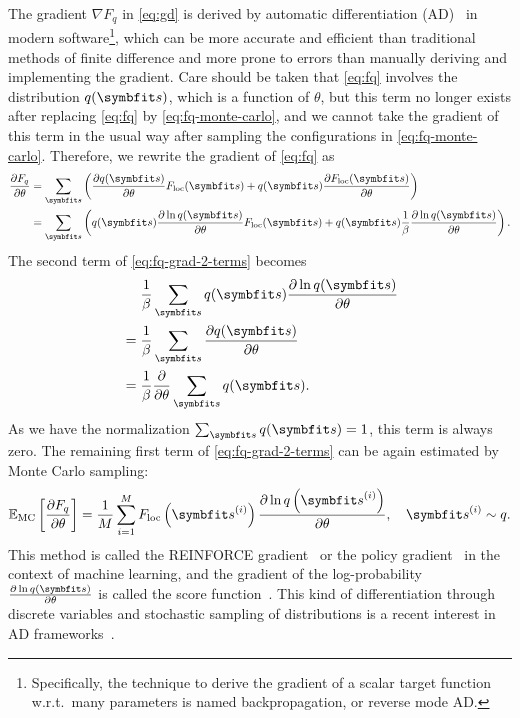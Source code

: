 The gradient $\nabla F_q$ in \cref{eq:gd} is derived by automatic differentiation (AD)~\cite{baydin2018automatic} in modern software\footnote{Specifically, the technique to derive the gradient of a scalar target function w.r.t.\ many parameters is named backpropagation, or reverse mode AD.}, which can be more accurate and efficient than traditional methods of finite difference and more prone to errors than manually deriving and implementing the gradient. Care should be taken that \cref{eq:fq} involves the distribution $q(\vs)$, which is a function of $\theta$, but this term no longer exists after replacing \cref{eq:fq} by \cref{eq:fq-monte-carlo}, and we cannot take the gradient of this term in the usual way after sampling the configurations in \cref{eq:fq-monte-carlo}. Therefore, we rewrite the gradient of \cref{eq:fq} as
\begin{align}
\frac{\partial F_q}{\partial \theta}
&= \sum_\vs \left( \frac{\partial q(\vs)}{\partial \theta} F_\text{loc}(\vs) + q(\vs) \frac{\partial F_\text{loc}(\vs)}{\partial \theta} \right) \\
&= \sum_\vs \left( q(\vs) \frac{\partial \ln q(\vs)}{\partial \theta} F_\text{loc}(\vs) + q(\vs) \frac{1}{\beta} \frac{\partial \ln q(\vs)}{\partial \theta} \right).
\label{eq:fq-grad-2-terms}
\end{align}
The second term of \cref{eq:fq-grad-2-terms} becomes
\begin{align}
&\phantom{{}={}}\frac{1}{\beta} \sum_\vs q(\vs) \frac{\partial \ln q(\vs)}{\partial \theta} \\
&= \frac{1}{\beta} \sum_\vs \frac{\partial q(\vs)}{\partial \theta} \\
&= \frac{1}{\beta} \frac{\partial}{\partial \theta} \sum_\vs q(\vs).
\end{align}
As we have the normalization $\sum_\vs q(\vs) = 1$, this term is always zero. The remaining first term of \cref{eq:fq-grad-2-terms} can be again estimated by Monte Carlo sampling:
\begin{equation}
\bbE_\text{MC}\left[ \frac{\partial F_q}{\partial \theta} \right]
= \frac{1}{M} \sum_{i = 1}^M F_\text{loc}\left( \vs^{(i)} \right) \frac{\partial \ln q\left( \vs^{(i)} \right)}{\partial \theta}, \quad
\vs^{(i)} \sim q.
\label{eq:fq-grad}
\end{equation}
This method is called the REINFORCE gradient~\cite{williams1992simple} or the policy gradient~\cite{sutton1999policy} in the context of machine learning, and the gradient of the log-probability $\frac{\partial \ln q(\vs)}{\partial \theta}$ is called the score function~\cite{fisher1935detection, hyvarinen2005estimation, mohamed2020monte}. This kind of differentiation through discrete variables and stochastic sampling of distributions is a recent interest in AD frameworks~\cite{krieken2021storchastic, arya2022automatic, catumba2023stochastic}.

